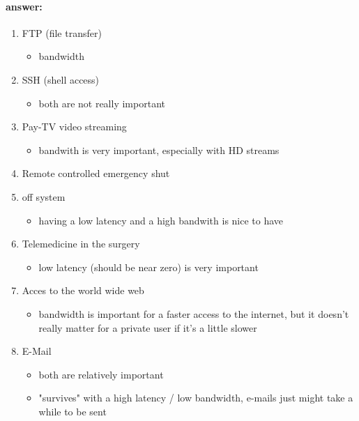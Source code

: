 \documentclass[a4paper,12pt]{article}
\begin{document}
 \paragraph{answer:}

 
 \begin{enumerate}[itemsep=0pt]
	 \item FTP (file transfer)
	  \begin{itemize}[itemsep=0pt]
	 	\item bandwidth
	  \end{itemize} 
	 \item SSH (shell access)
		\begin{itemize}[itemsep=0pt]
		 	\item both are not really important
	 	\end{itemize}  
	 \item Pay-TV video streaming
	 \begin{itemize}[itemsep=0pt]
	 	\item bandwith is very important, especially with HD streams
	 \end{itemize}  
	 \item Remote controlled emergency shut\item off system
	 \begin{itemize}[itemsep=0pt]
	 	\item having a low latency and a high bandwith is nice to have
	 \end{itemize}
	 \item Telemedicine in the surgery
	 \begin{itemize}[itemsep=0pt]
	 	\item low latency (should be near zero) is very important
	 \end{itemize}
	 \item Acces to the world wide web
	 \begin{itemize}[itemsep=0pt]
	 	\item bandwidth is important for a faster access to the internet, but it doesn't really matter for a private user if it's a little slower
	 \end{itemize}
	 \item E-Mail
	 \begin{itemize}[itemsep=0pt]
	 	\item both are relatively important
	 	\item "survives" with a high latency / low bandwidth, e-mails just might take a while to be sent
	 \end{itemize}
 \end{enumerate}
\end{document}
